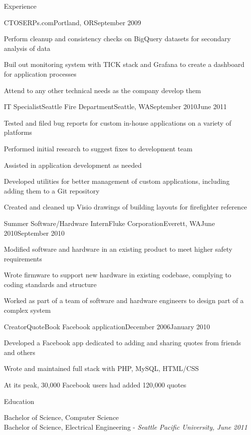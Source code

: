 \documentclass[letterpaper,10pt]{article}
\let\pt\presenttense
\begin{document}
\begin{res_section}{Experience}
\begin{res_experienceitem}{CTO}{SERPs.com}{Portland, OR}{September 2009}{{\pt[Present]{March 2017}}}
  \item Perform\pt{ed} cleanup and consistency checks on BigQuery datasets for secondary analysis of data
  \item Buil\pt[d]{t} out monitoring system with TICK stack and Grafana to create a dashboard for application processes
  \item Attend\pt{ed} to any other technical needs as the company develop\pt[s]{ed} them
\end{res_experienceitem}
\begin{res_experienceitem}{IT Specialist}{Seattle Fire Department}{Seattle, WA}{September 2010}{June 2011}
  \item Tested and filed bug reports for custom in-house applications on a variety of platforms
  \item Performed initial research to suggest fixes to development team
  \item Assisted in application development as needed
  \item Developed utilities for better management of custom applications, including adding them to a Git repository
  \item Created and cleaned up Visio drawings of building layouts for firefighter reference
\end{res_experienceitem}
\begin{res_experienceitem}{Summer Software/Hardware Intern}{Fluke Corporation}{Everett, WA}{June 2010}{September 2010}
  \item Modified software and hardware in an existing product to meet higher safety requirements
  \item Wrote firmware to support new hardware in existing codebase, complying to coding standards and structure
  \item Worked as part of a team of software and hardware engineers to design part of a complex system
\end{res_experienceitem}
\begin{res_experienceitem}{Creator}{QuoteBook Facebook application}{}{December 2006}{January 2010}
  \item Developed a Facebook app dedicated to adding and sharing quotes from friends and others
  \item Wrote and maintained full stack with PHP, MySQL, HTML/CSS
  \item At its peak, 30,000 Facebook users had added 120,000 quotes
\end{res_experienceitem}
\end{res_section}

\begin{res_section}{Education}
\begin{res_content}{Bachelor of Science, Computer Science\\
Bachelor of Science, Electrical Engineering - \em{Seattle Pacific University, June 2011}
}
\end{res_content}
\end{res_section}
\end{document}
